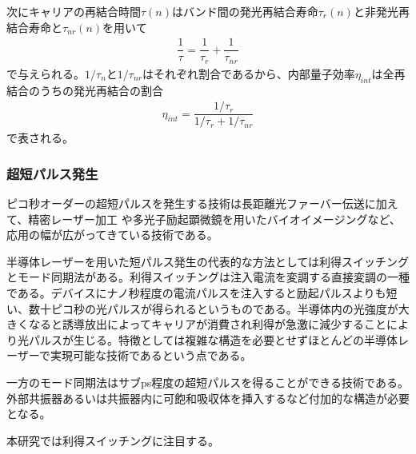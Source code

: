 次にキャリアの再結合時間$\tau(n)$はバンド間の発光再結合寿命$\tau_{r}(n)$と非発光再結合寿命と$\tau_{nr} (n)$を用いて
\begin{eqnarray}
\dfrac{1}{\tau}=\dfrac{1}{\tau_{r}}+\dfrac{1}{\tau_{nr}}
\label{eq:tau_r}
\end{eqnarray}
で与えられる。$1/\tau_{n}$と$1/\tau_{nr}$はそれぞれ割合であるから、内部量子効率$\eta_{int}$は全再結合のうちの発光再結合の割合
\begin{eqnarray}
\eta_{int}=\dfrac{1/\tau_{r}}{1/\tau_{r}+1/\tau_{nr}}
\end{eqnarray}
で表される。
\subsubsection{超短パルス発生}
ピコ秒オーダーの超短パルスを発生する技術は長距離光ファーバー伝送\cite{ref_hasegawa}に加えて、精密レーザー加工\cite{ref_chichkov} や多光子励起顕微鏡を用いたバイオイメージングなど、応用の幅が広がってきている技術である。

半導体レーザーを用いた短パルス発生の代表的な方法としては利得スイッチングとモード同期法がある。利得スイッチング\cite{ref_h_ito}は注入電流を変調する直接変調の一種である。デバイスにナノ秒程度の電流パルスを注入すると励起パルスよりも短い、数十ピコ秒の光パルスが得られるというものである。半導体内の光強度が大きくなると誘導放出によってキャリアが消費され利得が急激に減少することにより光パルスが生じる。特徴としては複雑な構造を必要とせずほとんどの半導体レーザーで実現可能な技術であるという点である。

一方のモード同期法はサブps程度の超短パルスを得ることができる技術である。外部共振器あるいは共振器内に可飽和吸収体を挿入するなど付加的な構造が必要となる。

本研究では利得スイッチングに注目する。

